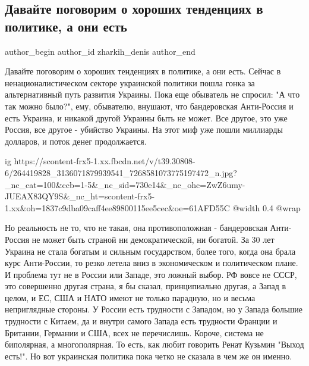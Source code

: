  
 
 
 
 
 
\subsection{Давайте поговорим о хороших тенденциях в политике, а они есть}
\label{sec:04_12_2021.fb.zharkih_denis.1.politika_tendencii}
 
\ifcmt
 author_begin
   author_id zharkih_denis
 author_end
\fi

Давайте поговорим о хороших тенденциях в политике, а они есть. Сейчас в
ненационалистическом секторе украинской политики пошла гонка за альтернативный
путь развития Украины. Пока еще обыватель не спросил: "А что так можно было?",
ему, обывателю, внушают, что бандеровская Анти-Россия и есть Украина, и никакой
другой Украины быть не может. Все другое, это уже Россия, все другое - убийство
Украины.  На этот миф уже пошли миллиарды долларов, и поток денег продолжается. 

\ifcmt
  ig https://scontent-frx5-1.xx.fbcdn.net/v/t39.30808-6/264419828_3136071879939541_7268581073775197472_n.jpg?_nc_cat=100&ccb=1-5&_nc_sid=730e14&_nc_ohc=ZwZ6umy-JUEAX83QY9S&_nc_ht=scontent-frx5-1.xx&oh=1837c9dba09caff4ee89800115ee5cec&oe=61AFD55C
  @width 0.4
  @wrap 
\fi

Но реальность не то, что не такая, она противоположная - бандеровская
Анти-Россия не может быть страной ни демократической, ни богатой. За 30 лет
Украина не стала богатым и сильным государством, более того, когда она брала
курс Анти-России, то резко летела вниз в экономическом и политическом плане. И
проблема тут не в России или Западе, это ложный выбор. РФ вовсе не СССР, это
совершенно другая страна, я бы сказал, принципиально другая, а Запад в целом, и
ЕС, США и НАТО имеют не только парадную, но и весьма неприглядные стороны. У
России есть трудности с Западом, но у Запада большие трудности с Китаем, да и
внутри самого Запада есть трудности Франции и Британии, Германии и США, всех не
перечислишь. Короче, система не биполярная, а многополярная. То есть, как любит
говорить Ренат Кузьмин "Выход есть!". Но вот украинская политика пока четко не
сказала в чем же он именно. 

